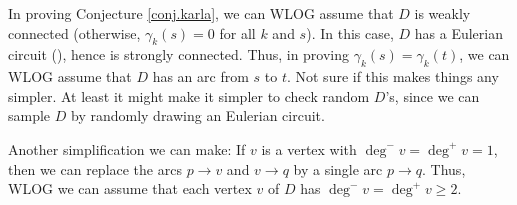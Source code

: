 \documentclass[numbers=enddot,12pt,final,onecolumn,notitlepage]{scrartcl}%
\theoremstyle{definition}
\newenvironment{proof}[1][Proof]{\noindent\textbf{#1.} }{\ \rule{0.5em}{0.5em}}
\newenvironment{noncompile}{}{}
\theoremstyle{plainsl}
\begin{document}
\begin{comment}
\begin{proof}
$\Longrightarrow$: Assume that $B$ is an $s$-convergence. Thus, $s$ is a to-root of $D\left\langle B\right\rangle $.

If there was an arc of $D\left\langle B\right\rangle $ with source $s$, then we could extend this arc to a cycle... and so $B$ would not be acyclic... So $s$ is a sink of $D\left\langle B\right\rangle $.

Furthermore, no vertex $v \neq s$ can be a sink of $D\left\langle B\right\rangle $, since $D\left\langle B\right\rangle $ must have a path from $v$ to $s$ (because $s$ is a to-root of $D\left\langle B\right\rangle $). So we conclude that $s$ is the only sink of $D\left\langle B\right\rangle $.
\medskip

$\Longleftarrow$: Assume that $s$ is the only sink of $D\left\langle B\right\rangle $.

Then, we can start at any vertex $v$ and keep wandering along arcs in $B$, we eventually get stuck at a sink (since the acyclicity of $B$ prevents us from revisiting a vertex), and this sink must be $s$ (since $s$ is the only sink of $D\left\langle B\right\rangle $). Thus, there is a path from $v$ to $s$ (it is a path, since we could not revisit any vertices). So ...
\end{proof}
\end{comment}

\begin{noncompile}
In proving Conjecture \ref{conj.karla}, we can WLOG assume that $D$ is weakly
connected (otherwise, $\gamma_{k}\left(  s\right)  =0$ for all $k$ and $s$).
In this case, $D$ has a Eulerian circuit (\cite[Theorem 4.7.2]{22s}), hence is
strongly connected. Thus, in proving $\gamma_{k}\left(  s\right)  =\gamma
_{k}\left(  t\right)  $, we can WLOG assume that $D$ has an arc from $s$ to
$t$. Not sure if this makes things any simpler. At least it might make it
simpler to check random $D$'s, since we can sample $D$ by randomly drawing an
Eulerian circuit.

Another simplification we can make: If $v$ is a vertex with $\deg^{-}%
v=\deg^{+}v=1$, then we can replace the arcs $p\rightarrow v$ and
$v\rightarrow q$ by a single arc $p\rightarrow q$. Thus, WLOG we can assume
that each vertex $v$ of $D$ has $\deg^{-}v=\deg^{+}v\geq2$.
\end{noncompile}
\end{document}
